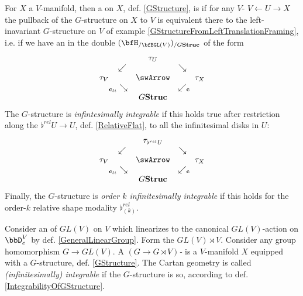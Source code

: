 \begin{defn}
\label{IntegrabilityOfGStructure}\hypertarget{IntegrabilityOfGStructure}{}
For $X$ a $V$-manifold, then a  on $X$, def. \ref{GStructure}, is  if for any $V$- $V \leftarrow U \rightarrow X$ the pullback of the $G$-structure on $X$ to $V$ is equivalent there to the left-inavariant $G$-structure on $V$ of example \ref{GStructureFromLeftTranslationFraming}, i.e. if we have an  in the double  $(\bfH_{/\bfBGL(V)})_{/G\mathbf{Struc}}$ of the form
\begin{displaymath}
\itexarray{
&& \tau_U
\\
& \swarrow && \searrow
\\
\tau_V && \swArrow && \tau_X
\\
& {}_{\mathllap{\mathbf{c}_{li}}}\searrow && \swarrow_{\mathrlap{\mathbf{c}}}
\\
&& G \mathbf{Struc}
}
\end{displaymath}
The $G$-structure is \emph{infintesimally integrable} if this holds true after restriction along the  $\flat^{rel} U \to U$, def. \ref{RelativeFlat}, to all the infinitesimal disks in $U$:
\begin{displaymath}
\itexarray{
&& \tau_{\flat^{rel}U}
\\
& \swarrow && \searrow
\\
\tau_V && \swArrow && \tau_X
\\
& {}_{\mathllap{\mathbf{c}_{li}}}\searrow && \swarrow_{\mathrlap{\mathbf{c}}}
\\
&& G \mathbf{Struc}
}
\end{displaymath}
Finally, the $G$-structure is \emph{order $k$ infinitesimally integrable} if this holds for the order-$k$ relative shape modality $\flat^{rel}_{(k)}$.
\end{defn}
\begin{defn}
\label{CartanGeometry}\hypertarget{CartanGeometry}{}
Consider an  of $GL(V)$ on $V$ which linearizes to the canonical $GL(V)$-action on $\bbD^V_e$ by def. \ref{GeneralLinearGroup}. Form the  $GL(V) \rtimes V$. Consider any group homomorphism $G\to GL(V)$.
A \emph{$(G\to G\rtimes V)$-} is a $V$-manifold $X$ equipped with a $G$-structure, def. \ref{GStructure}. The Cartan geometry is called \emph{(infinitesimally) integrable} if the $G$-structure is so, according to def. \ref{IntegrabilityOfGStructure}.
\end{defn}

